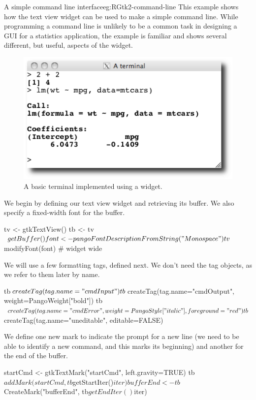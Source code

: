 \begin{example}{A simple command line interface}{eg:RGtk2-command-line}
This example shows how the text view widget can be used to make a
simple command line. While programming a command line is unlikely to
be a common task in designing a GUI for a statistics
application, the example is familiar and shows several different, but
useful, aspects of the widget.

\begin{figure}
  \centering
  \includegraphics[width=.6\textwidth]{ex-RGtk2-terminal}
  \caption{A basic \R\/ terminal implemented using a  widget.}
  \label{fig:RGtk2-terminal}
\end{figure}


We begin by defining our text view widget and retrieving its
buffer. We also specify a fixed-width font for the buffer.
\begin{Schunk}
\begin{Sinput}
 tv <- gtkTextView()
 tb <- tv$getBuffer()
 font <- pangoFontDescriptionFromString("Monospace")
 tv$modifyFont(font)                     # widget wide
\end{Sinput}
\end{Schunk}

We will use a few formatting tags, defined next. We don't need the tag
objects, as we refer to them later by name.
\begin{Schunk}
\begin{Sinput}
 tb$createTag(tag.name="cmdInput")
 tb$createTag(tag.name="cmdOutput", 
              weight=PangoWeight["bold"])
 tb$createTag(tag.name="cmdError", 
              weight=PangoStyle["italic"], foreground="red")
 tb$createTag(tag.name="uneditable", editable=FALSE)
\end{Sinput}
\end{Schunk}

We define one new mark to indicate the prompt for a new line (we need to be able to identify a
new command, and this marks its beginning) and
another for the end of the buffer. 
\begin{Schunk}
\begin{Sinput}
 startCmd <- gtkTextMark("startCmd", left.gravity=TRUE)
 tb$addMark(startCmd, tb$getStartIter()$iter)
 bufferEnd <- tb$CreateMark("bufferEnd", tb$getEndIter()$iter)
\end{Sinput}
\end{Schunk}


\end{example}
